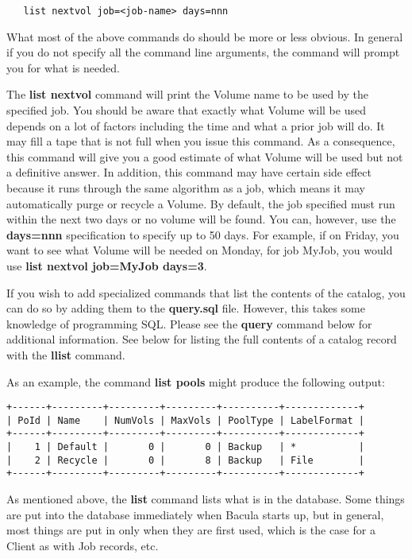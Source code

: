 \begin{description}
\begin{verbatim}
   list nextvol job=<job-name> days=nnn

\end{verbatim}
\normalsize

   What most of the above commands do should be more or less obvious.  In
   general if you do not specify all the command line arguments, the
   command will prompt you for what is needed.

   The {\bf list nextvol} command will print the Volume name to be used by
   the specified job.  You should be aware that exactly what Volume will be
   used depends on a lot of factors including the time and what a prior job
   will do.  It may fill a tape that is not full when you issue this
   command.  As a consequence, this command will give you a good estimate
   of what Volume will be used but not a definitive answer.  In addition,
   this command may have certain side effect because it runs through the
   same algorithm as a job, which means it may automatically purge or
   recycle a Volume. By default, the job specified must run within the 
   next two days or no volume will be found. You can, however, use the
   {\bf days=nnn} specification to specify up to 50 days. For example,
   if on Friday, you want to see what Volume will be needed on Monday,
   for job MyJob, you would use {\bf list nextvol job=MyJob days=3}.

   If you wish to add specialized commands that list the contents of the
   catalog, you can do so by adding them to the {\bf query.sql} file.
   However, this takes some knowledge of programming SQL. Please see the
   {\bf query} command below for additional information.  See below for
   listing the full contents of a catalog record with the {\bf llist}
   command.

   As an example, the command {\bf list pools} might produce  the following
   output: 

\footnotesize
\begin{verbatim}
+------+---------+---------+---------+----------+-------------+
| PoId | Name    | NumVols | MaxVols | PoolType | LabelFormat |
+------+---------+---------+---------+----------+-------------+
|    1 | Default |       0 |       0 | Backup   | *           |
|    2 | Recycle |       0 |       8 | Backup   | File        |
+------+---------+---------+---------+----------+-------------+
\end{verbatim}
\normalsize

   As mentioned above, the {\bf list} command lists what is in the
   database.  Some things are put into the database immediately when Bacula
   starts up, but in general, most things are put in only when they are
   first used, which is the case for a Client as with Job records, etc.


\end{description}
